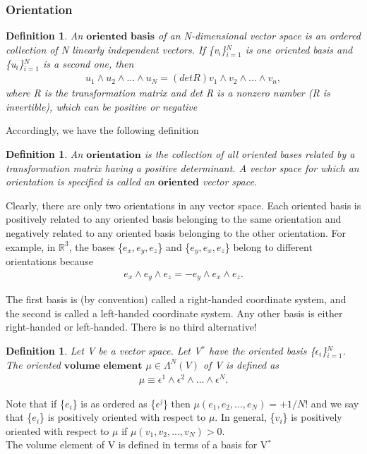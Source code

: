 \documentclass[12pt,a4paper]{article}
\newtheorem{defn}[thm]{Definition}
\begin{document}
\subsubsection{Orientation}
\begin{defn}
An $\textbf{oriented basis}$ of an N-dimensional vector space is
an ordered collection of N linearly independent vectors.
If \{v$_i$\}$^N_{i=1}$ is one oriented basis and \{u$_i$\}$^N_{i=1}$ is a second one, then\\
\begin{eqnarray*}
u_1 \wedge u_2 \wedge ... \wedge u_N = (det R)v_1 \wedge v_2 \wedge ... \wedge v_n,
\end{eqnarray*}
where R is the transformation matrix and det R is a nonzero number (R is
invertible), which can be positive or negative
\end{defn}
 \indent Accordingly, we have the following definition
\begin{defn}
An $\textbf{orientation}$ is the collection of all oriented bases related by a transformation matrix having a positive determinant. A vector
space for which an orientation is specified is called an $\textbf{oriented}$ vector space.
\end{defn}
\indent Clearly, there are only two orientations in any vector space. Each oriented
basis is positively related to any oriented basis belonging to the same orientation and negatively related to any oriented basis belonging to the other
orientation. For example, in $\mathbb{R}^3$,  the bases \{$e_x, e_y, e_z$\} and \{$e_y, e_x, e_z$\} belong
to different orientations because
\begin{eqnarray*}
e_x \wedge e_y \wedge e_z = -e_y \wedge e_x \wedge e_z.
\end{eqnarray*}

The first basis is (by convention) called a right-handed coordinate system,
and the second is called a left-handed coordinate system. Any other basis
is either right-handed or left-handed. There is no third alternative!

\begin{defn}
Let V be a vector space. Let V$^{*}$ have the oriented basis \{$\epsilon_i$\}$^N_{i=1}$. The oriented $\textbf{volume element}$ $\mu \in \Lambda^{N}(V)$ of V is defined as
\begin{eqnarray*}
\mu \equiv \epsilon^1 \wedge \epsilon^2 \wedge ... \wedge \epsilon^N.
\end{eqnarray*}
\end{defn}
\indent Note that if \{$e_i$\} is as ordered as \{$\epsilon^j$\} then $\mu( e_1, e_2, ... , e_N) = +1/N!$ and we say that \{$e_i$\} is positively oriented with respect to $\mu$. In general, \{$v_i$\}  is
positively oriented with respect to $\mu$ if $\mu(v_1, v_2, ... , v_N) > 0$. \\ The volume element of V is defined in terms of a basis for V$^*$
\end{document}
